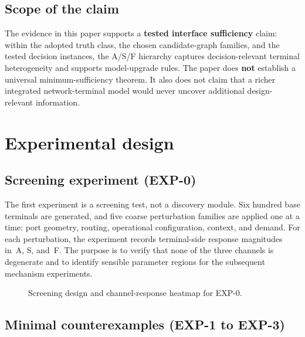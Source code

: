 \documentclass[review,authoryear]{elsarticle}
\begin{document}
\subsection{Scope of the claim}
\label{sec:models:scope}

The evidence in this paper supports a \textbf{tested interface sufficiency} claim: within the adopted truth class, the chosen candidate-graph families, and the tested decision instances, the A/S/F hierarchy captures decision-relevant terminal heterogeneity and supports model-upgrade rules. The paper does \textbf{not} establish a universal minimum-sufficiency theorem. It also does not claim that a richer integrated network-terminal model would never uncover additional design-relevant information.


\section{Experimental design}
\label{sec:experiments}

\subsection{Screening experiment (EXP-0)}
\label{sec:exp:screening}

The first experiment is a screening test, not a discovery module. Six hundred base terminals are generated, and five coarse perturbation families are applied one at a time: port geometry, routing, operational configuration, context, and demand. For each perturbation, the experiment records terminal-side response magnitudes in~A, S, and~F. The purpose is to verify that none of the three channels is degenerate and to identify sensible parameter regions for the subsequent mechanism experiments.

\begin{figure}[htbp]
  \centering
  \caption{Screening design and channel-response heatmap for EXP-0.}
  \label{fig:exp0}
\end{figure}

\subsection{Minimal counterexamples (EXP-1 to EXP-3)}
\label{sec:exp:counterexamples}
\end{document}
